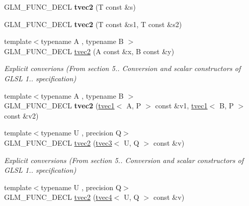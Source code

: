 \begin{DoxyCompactItemize}
\item 
\hypertarget{structglm_1_1tvec2_abc8539f2097eef27ab0b86324de539ee}{G\-L\-M\-\_\-\-F\-U\-N\-C\-\_\-\-D\-E\-C\-L {\bfseries tvec2} (T const \&s)}\label{structglm_1_1tvec2_abc8539f2097eef27ab0b86324de539ee}

\item 
\hypertarget{structglm_1_1tvec2_a02920764d82b69b83ae7a5d21d276a67}{G\-L\-M\-\_\-\-F\-U\-N\-C\-\_\-\-D\-E\-C\-L {\bfseries tvec2} (T const \&s1, T const \&s2)}\label{structglm_1_1tvec2_a02920764d82b69b83ae7a5d21d276a67}

\item 
\hypertarget{structglm_1_1tvec2_a100b3001f4ba3e898f6dbef516310e68}{{\footnotesize template$<$typename A , typename B $>$ }\\G\-L\-M\-\_\-\-F\-U\-N\-C\-\_\-\-D\-E\-C\-L \hyperlink{structglm_1_1tvec2_a100b3001f4ba3e898f6dbef516310e68}{tvec2} (A const \&x, B const \&y)}\label{structglm_1_1tvec2_a100b3001f4ba3e898f6dbef516310e68}

\begin{DoxyCompactList}\small\item\em Explicit converions (From section 5.. Conversion and scalar constructors of G\-L\-S\-L 1.. specification) \end{DoxyCompactList}\item 
\hypertarget{structglm_1_1tvec2_a235db039294c64b2b05b42f8a6b65ffe}{{\footnotesize template$<$typename A , typename B $>$ }\\G\-L\-M\-\_\-\-F\-U\-N\-C\-\_\-\-D\-E\-C\-L {\bfseries tvec2} (\hyperlink{structglm_1_1tvec1}{tvec1}$<$ A, P $>$ const \&v1, \hyperlink{structglm_1_1tvec1}{tvec1}$<$ B, P $>$ const \&v2)}\label{structglm_1_1tvec2_a235db039294c64b2b05b42f8a6b65ffe}

\item 
\hypertarget{structglm_1_1tvec2_a9b2fdfe551a1905a663122f78b918728}{{\footnotesize template$<$typename U , precision Q$>$ }\\G\-L\-M\-\_\-\-F\-U\-N\-C\-\_\-\-D\-E\-C\-L \hyperlink{structglm_1_1tvec2_a9b2fdfe551a1905a663122f78b918728}{tvec2} (\hyperlink{structglm_1_1tvec3}{tvec3}$<$ U, Q $>$ const \&v)}\label{structglm_1_1tvec2_a9b2fdfe551a1905a663122f78b918728}

\begin{DoxyCompactList}\small\item\em Explicit conversions (From section 5.. Conversion and scalar constructors of G\-L\-S\-L 1.. specification) \end{DoxyCompactList}\item 
\hypertarget{structglm_1_1tvec2_a1cca234edbe71fe7b5045303634f18f5}{{\footnotesize template$<$typename U , precision Q$>$ }\\G\-L\-M\-\_\-\-F\-U\-N\-C\-\_\-\-D\-E\-C\-L \hyperlink{structglm_1_1tvec2_a1cca234edbe71fe7b5045303634f18f5}{tvec2} (\hyperlink{structglm_1_1tvec4}{tvec4}$<$ U, Q $>$ const \&v)}\label{structglm_1_1tvec2_a1cca234edbe71fe7b5045303634f18f5}


\end{DoxyCompactItemize}
